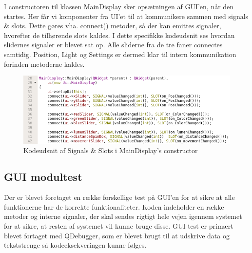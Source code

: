 I constructoren til klassen MainDisplay sker opsætningen af GUI'en, når den startes. Her får vi komponenter fra UI'et til at kommunikere sammen med signals \& slots. Dette gøres vha. connect() metoder, så der kan emittes signaler, hvorefter de tilhørende slots kaldes. I dette specifikke kodeudsnit ses hvordan slidernes signaler er blevet sat op. Alle sliderne fra de tre faner connectes samtidig. Position, Light og Settings er dermed klar til intern kommunikation forinden metoderne kaldes.

\begin{figure}[H]
\centering
\includegraphics[width=0.9\linewidth]{0_Filer/Figuer/signalSlot.png}
\caption{Kodeudsnit af Signals \& Slots i MainDisplay's constructor}
\label{fig:signalSlot}
\end{figure}

\subsection{GUI modultest}
Der er blevet foretaget en række forskellige test på GUI'en for at sikre at alle funktionerne har de korrekte funktionaliteter. Koden indeholder en række metoder og interne signaler, der skal sendes rigtigt hele vejen igennem systemet for at sikre, at resten af systemet vil kunne bruge disse. GUI test er primært blevet fortaget med QDebugger, som er blevet brugt til at udskrive data og tekststrenge så kodeeksekveringen kunne følges. \newline

